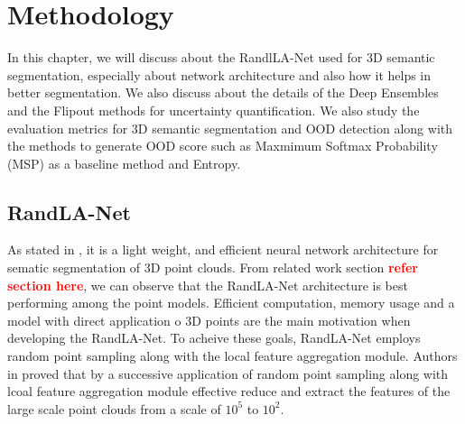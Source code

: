 
\chapter{Methodology}
In this chapter, we will discuss about the RandlLA-Net used for 3D semantic segmentation, especially about network architecture and also how it helps in better segmentation.
We also discuss about the details of the Deep Ensembles and the Flipout methods for uncertainty quantification.
We also study the evaluation metrics for 3D semantic segmentation and OOD detection along with the methods to generate OOD score such as Maxmimum Softmax Probability (MSP) as a baseline method and Entropy.
\section{RandLA-Net}
\label{sec:meth_randla}
As stated in \cite{Hu_2020_CVPR_Randla}, it is a light weight, and efficient neural network architecture for sematic segmentation of 3D point clouds.
From related work section \textcolor{red}{\textbf{refer section here}}, we can observe that the RandLA-Net architecture is best performing among the point models.
Efficient computation, memory usage and a model with direct application o 3D points are the main motivation when developing the RandLA-Net.
To acheive these goals, RandLA-Net employs random point sampling along with the local feature aggregation module.
Authors in \cite{Hu_2020_CVPR_Randla} proved that by a successive application of random point sampling along with lcoal feature aggregation module effective reduce and extract the features of the large scale point clouds from a scale of $10^5$ to $10^2$.

